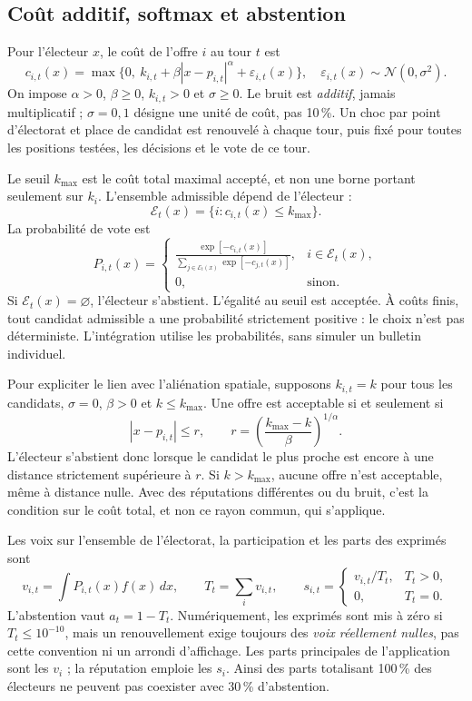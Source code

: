 \documentclass[11pt,a4paper]{article}
\begin{document}
\subsection{Coût additif, softmax et abstention}
Pour l'électeur $x$, le coût de l'offre $i$ au tour $t$ est
\begin{equation}\label{eq:cost}
\boxed{c_{i,t}(x)=\max\{0,\ k_{i,t}+\beta|x-p_{i,t}|^\alpha+
\varepsilon_{i,t}(x)\}},\quad
\varepsilon_{i,t}(x)\sim\mathcal N(0,\sigma^2).
\end{equation}
On impose $\alpha>0$, $\beta\geq0$, $k_{i,t}>0$ et $\sigma\geq0$.
Le bruit est \emph{additif}, jamais multiplicatif ; $\sigma=0{,}1$
désigne une unité de coût, pas 10\,\%. Un choc par point d'électorat et
place de candidat est renouvelé à chaque tour, puis fixé pour toutes
les positions testées, les décisions et le vote de ce tour.

Le seuil $k_{\max}$ est le coût total maximal accepté, et non une borne
portant seulement sur $k_i$. L'ensemble admissible dépend de l'électeur :
\[
\mathcal E_t(x)=\{i:c_{i,t}(x)\leq k_{\max}\}.
\]
La probabilité de vote est
\begin{equation}
P_{i,t}(x)=
\begin{cases}
\displaystyle\frac{\exp[-c_{i,t}(x)]}
{\sum_{j\in\mathcal E_t(x)}\exp[-c_{j,t}(x)]},
& i\in\mathcal E_t(x),\\[6pt]
0,&\text{sinon}.
\end{cases}
\end{equation}
Si $\mathcal E_t(x)=\varnothing$, l'électeur s'abstient.
L'égalité au seuil est acceptée. À coûts finis, tout candidat admissible
a une probabilité strictement positive : le choix n'est pas déterministe.
L'intégration utilise les probabilités, sans simuler un bulletin individuel.

Pour expliciter le lien avec l'aliénation spatiale, supposons
$k_{i,t}=k$ pour tous les candidats, $\sigma=0$, $\beta>0$ et
$k\leq k_{\max}$. Une offre est acceptable si et seulement si
\[
|x-p_{i,t}|\leq
r,\qquad
r=\left(\frac{k_{\max}-k}{\beta}\right)^{1/\alpha}.
\]
L'électeur s'abstient donc lorsque le candidat le plus proche est
encore à une distance strictement supérieure à $r$. Si $k>k_{\max}$,
aucune offre n'est acceptable, même à distance nulle. Avec des
réputations différentes ou du bruit, c'est la condition sur le coût
total, et non ce rayon commun, qui s'applique.

Les voix sur l'ensemble de l'électorat, la participation et les parts
des exprimés sont
\[
v_{i,t}=\int P_{i,t}(x)f(x)\,dx,\qquad
T_t=\sum_i v_{i,t},\qquad
s_{i,t}=\begin{cases}v_{i,t}/T_t,&T_t>0,\\0,&T_t=0.\end{cases}
\]
L'abstention vaut $a_t=1-T_t$. Numériquement, les exprimés sont mis à
zéro si $T_t\leq10^{-10}$, mais un renouvellement exige toujours des
\emph{voix réellement nulles}, pas cette convention ni un arrondi d'affichage.
Les parts principales de l'application sont les $v_i$ ; la réputation
emploie les $s_i$. Ainsi des parts totalisant 100\,\% des électeurs
ne peuvent pas coexister avec 30\,\% d'abstention.
\end{document}
